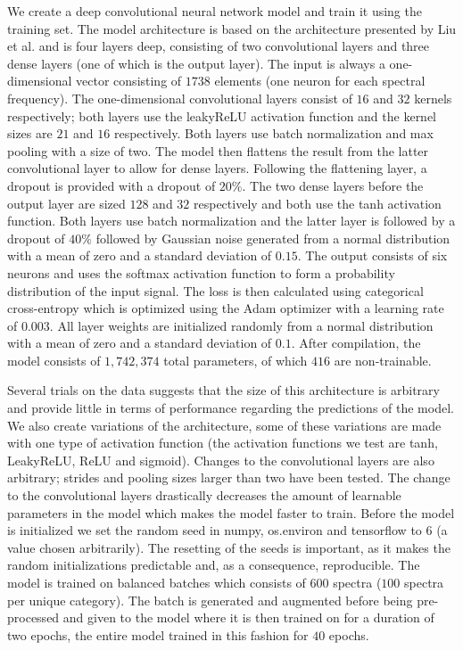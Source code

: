 We create a deep convolutional neural network model and train it using the training set. The model architecture is based on the architecture presented by Liu et al. \cite{liu2017deep} and is four layers deep, consisting of two convolutional layers and three dense layers (one of which is the output layer). The input is always a one-dimensional vector consisting of $1738$ elements (one neuron for each spectral frequency). The one-dimensional convolutional layers consist of $16$ and $32$ kernels respectively; both layers use the leakyReLU activation function and the kernel sizes are $21$ and $16$ respectively. Both layers use batch normalization and max pooling with a size of two. The model then flattens the result from the latter convolutional layer to allow for dense layers. Following the flattening layer, a dropout is provided with a dropout of $20\%$. The two dense layers before the output layer are sized $128$ and $32$ respectively and both use the tanh activation function. Both layers use batch normalization and the latter layer is followed by a dropout of $40\%$ followed by Gaussian noise generated from a normal distribution with a mean of zero and a standard deviation of $0.15$. The output consists of six neurons and uses the softmax activation function to form a probability distribution of the input signal. The loss is then calculated using categorical cross-entropy which is optimized using the Adam optimizer with a learning rate of $0.003$. All layer weights are initialized randomly from a normal distribution with a mean of zero and a standard deviation of $0.1$. After compilation, the model consists of $1,742,374$ total parameters, of which $416$ are non-trainable.

Several trials on the data suggests that the size of this architecture is arbitrary and provide little in terms of performance regarding the predictions of the model. We also create variations of the architecture, some of these variations are made with one type of activation function (the activation functions we test are tanh, LeakyReLU, ReLU and sigmoid). Changes to the convolutional layers are also arbitrary; strides and pooling sizes larger than two have been tested. The change to the convolutional layers drastically decreases the amount of learnable parameters in the model which makes the model faster to train. Before the model is initialized we set the random seed in numpy, os.environ and tensorflow to 6 (a value chosen arbitrarily). The resetting of the seeds is important, as it makes the random initializations predictable and, as a consequence, reproducible. The model is trained on balanced batches which consists of $600$ spectra ($100$ spectra per unique category). The batch is generated and augmented before being pre-processed and given to the model where it is then trained on for a duration of two epochs, the entire model trained in this fashion for $40$ epochs.

